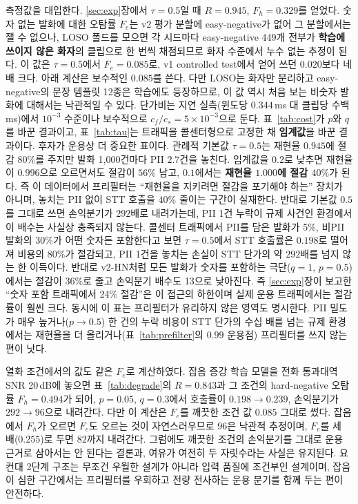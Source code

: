 \documentclass[10pt,twocolumn]{article}
\renewcommand{\emph}[1]{\textbf{#1}}
\begin{document}
측정값을 대입한다. \ref{sec:exp}장에서 $\tau=0.5$일 때 $R=0.945$, $F_h=0.329$를 얻었다. 숫자 없는
발화에 대한 오탐률 $F_e$는 v2 평가 분할에 easy-negative가 없어 그 분할에서는 잴 수 없으나, LOSO
폴드를 모으면 각 시드마다 easy-negative 449개 전부가 \emph{학습에 쓰이지 않은 화자}의 클립으로
한 번씩 채점되므로 화자 수준에서 누수 없는 추정이 된다. 이 값은 $\tau=0.5$에서 $F_e=0.085$로,
v1 controlled test에서 얻어 쓰던 $0.020$보다 네 배 크다. 아래 계산은 보수적인 $0.085$를 쓴다.
다만 LOSO는 화자만 분리하고 easy-negative의 문장 템플릿 12종은 학습에도 등장하므로, 이 값 역시
처음 보는 비숫자 발화에 대해서는 낙관적일 수 있다. 단가비는 지연
실측(윈도당 $0.344$\,ms 대 클립당 수백 ms)에서 $10^{-3}$ 수준이나 보수적으로
$c_f/c_s=5\times10^{-3}$으로 둔다. 표~\ref{tab:cost}가 $p$와 $q$를 바꾼 결과이고, 표~\ref{tab:tau}는 트래픽을 콜센터형으로 고정한 채
\emph{임계값}을 바꾼 결과이다. 후자가 운용상 더 중요한 표이다. 관례적 기본값 $\tau=0.5$는 재현율
$0.945$에 절감 $80\%$를 주지만 발화 1{,}000건마다 PII $2.7$건을 놓친다. 임계값을 $0.2$로
낮추면 재현율이 $0.996$으로 오르면서도 절감이 $56\%$ 남고, $0.1$에서는 \emph{재현율 $1.000$에
절감 $40\%$}가 된다. 즉 이 데이터에서 프리필터는 ``재현율을 지키려면 절감을 포기해야 하는''
장치가 아니며, 놓치는 PII 없이 STT 호출을 $40\%$ 줄이는 구간이 실재한다. 반대로 기본값 $0.5$를
그대로 쓰면 손익분기가 $292$배로 내려가는데, PII 1건 누락이 규제 사건인 환경에서 이 배수는 사실상
충족되지 않는다. 콜센터 트래픽에서 PII를 담은 발화가 5\%, 비PII 발화의 30\%가 어떤 숫자든
포함한다고 보면 $\tau=0.5$에서 STT 호출률은 $0.198$로 떨어져 비용의 $80\%$가 절감되고, PII 1건을 놓치는 손실이 STT 단가의 약
$292$배를 넘지 않는 한 이득이다.
반대로 v2-HN처럼 모든 발화가 숫자를 포함하는 극단($q=1$, $p=0.5$)에서는 절감이 36\%로 줄고
손익분기 배수도 13으로 낮아진다. 즉 \ref{sec:exp}장이 보고한 ``숫자 포함 트래픽에서 24\%
절감''은 이 접근의 하한이며 실제 운용 트래픽에서는 절감률이 훨씬 크다. 동시에 이 표는 프리필터가
유리하지 않은 영역도 명시한다. PII 밀도가 매우 높거나($p\!\to\!0.5$) 한 건의 누락 비용이 STT
단가의 수십 배를 넘는 규제 환경에서는 재현율을 더 올리거나(표~\ref{tab:prefilter}의 $0.99$
운용점) 프리필터를 쓰지 않는 편이 낫다.

열화 조건에서의 값도 같은 $F_e$로 계산하였다. 잡음 증강 학습 모델을 전화 통과대역 SNR 20\,dB에
놓으면 표~\ref{tab:degrade}의 $R=0.843$과 그 조건의 hard-negative 오탐률 $F_h=0.494$가 되어,
$p=0.05$, $q=0.3$에서 호출률이 $0.198\to0.239$, 손익분기가 $292\to96$으로 내려간다. 다만 이
계산은 $F_e$를 깨끗한 조건 값 $0.085$ 그대로 썼다. 잡음에서 $F_h$가 오르면 $F_e$도 오르는 것이
자연스러우므로 $96$은 낙관적 추정이며, $F_e$를 세 배($0.255$)로 두면 $82$까지 내려간다. 그럼에도 깨끗한 조건의 손익분기를 그대로 운용 근거로 삼아서는 안 된다는 결론과, 여유가
여전히 두 자릿수라는 사실은 유지된다. 요컨대 2단계 구조는 무조건 우월한 설계가 아니라 입력
품질에 조건부인 설계이며, 잡음이 심한 구간에서는 프리필터를 우회하고 전량 전사하는 운용 분기를
함께 두는 편이 안전하다.
\end{document}

